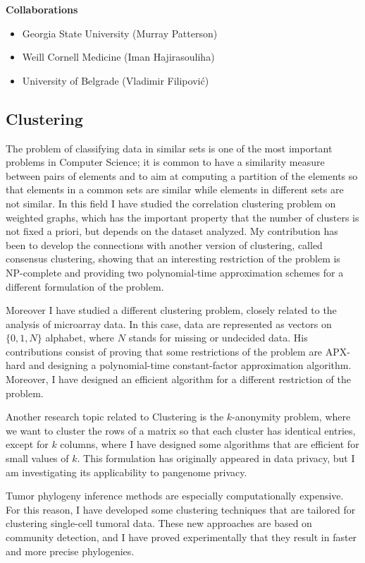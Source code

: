 \documentclass[11pt,a4paper,roman]{moderncv}
\begin{document}
\textbf{Collaborations}

\begin{itemize}
	\item
	      Georgia State University (Murray Patterson)
	\item
	      Weill Cornell Medicine (Iman Hajirasouliha)
	\item
	      University of Belgrade (Vladimir Filipović)
\end{itemize}

\subsection{Clustering}\label{clustering}

The problem of classifying data in similar sets is one of the most
important problems in Computer Science; it is common to have a
similarity measure between pairs of elements and to aim at computing a
partition of the elements so that elements in a common sets are similar
while elements in different sets are not similar. In this field
I have studied the correlation clustering
problem on weighted graphs, which has the important property that the number of
clusters is not fixed a priori, but depends on the dataset analyzed.
My contribution has been to develop the connections with another version of
clustering, called consensus clustering, showing that an
interesting restriction of the problem is NP-complete and providing two
polynomial-time approximation schemes for a different formulation of the
problem.

Moreover I have studied a different clustering problem, closely related
to the analysis of microarray data. In this case, data are represented
as vectors on \(\{0,1,N\}\) alphabet, where \(N\) stands for missing or
undecided data. His contributions consist of proving that some
restrictions of the problem are APX-hard and designing a polynomial-time
constant-factor approximation algorithm. Moreover, I have designed an
efficient algorithm for a different restriction of the problem.

Another research topic related to Clustering is the \(k\)-anonymity problem,
where we want to cluster the rows of a matrix so that each cluster has identical
entries, except for \(k\) columns, where I have designed some algorithms that
are efficient for small values of \(k\).
This formulation has originally appeared in data privacy, but I am investigating
its applicability to pangenome privacy.


Tumor phylogeny inference methods are especially computationally expensive.
For this reason, I have developed some clustering techniques that are tailored
for clustering single-cell tumoral data.
These new approaches are based on community detection, and I have proved
experimentally that they result in faster and more precise phylogenies.
\end{document}
